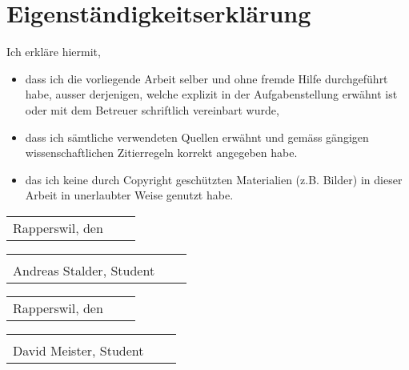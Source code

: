 \chapter*{Eigenständigkeitserklärung}
Ich erkläre hiermit, 
\begin{itemize}
\item dass ich die vorliegende Arbeit selber und ohne fremde Hilfe durchgeführt habe, ausser derjenigen, welche explizit in der Aufgabenstellung erwähnt ist oder mit dem Betreuer schriftlich vereinbart wurde,
\item dass ich sämtliche verwendeten Quellen erwähnt und gemäss gängigen wissenschaftlichen Zitierregeln korrekt angegeben habe.
\item das ich keine durch Copyright geschützten Materialien (z.B. Bilder) in dieser Arbeit in unerlaubter Weise genutzt habe. 
\end{itemize}

\vspace{2,5 cm} 
\begin{tabular}{p{7cm}p{.5cm}l}
Rapperswil, den\dotfill
\end{tabular}%
\hfill 
\begin{tabular}{p{7cm}p{.5cm}l}
\dotfill \\ 
Andreas Stalder, Student
\end{tabular}

\vspace{1 cm} 
\begin{tabular}{p{7cm}p{.5cm}l}
Rapperswil, den\dotfill
\end{tabular}
\hfill 
\begin{tabular}{p{7cm}p{.5cm}l}
\dotfill \\ 
David Meister, Student
\end{tabular}
